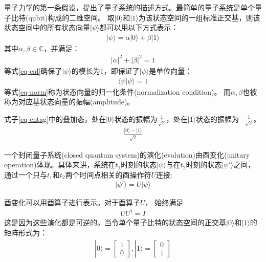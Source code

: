 量子力学的第一条假设，提出了量子系统的描述方式。最简单的量子系统是单个量子比特(qubit)构成的二维空间。
取$|0\rangle$和$|1\rangle$为该状态空间的一组标准正交基，则该状态空间中的所有状态向量$|\psi\rangle$都可以用以下方式表示：
\begin{align}
    |\psi\rangle = \alpha|0\rangle + \beta|1\rangle
\end{align}
其中$\alpha,\beta\in \mathbb{C}$，并满足：
\begin{align}
    |\alpha|^2+|\beta|^2  = 1
    \label{eq-cal}
\end{align}
等式\ref{eq-cal}确保了$|\psi\rangle$的模长为1，即保证了$|\psi\rangle$是单位向量：
\begin{align}
    \langle\psi|\psi\rangle = 1
    \label{eq-norm}
\end{align}
等式\ref{eq-norm}称为状态向量的归一化条件(normalization condition)。
而\(\alpha,\beta\)也被称为对应基状态向量的振幅(amplitude)。
\begin{example}
    式子\ref{eq-entag}中的叠加态，处在$|0\rangle$状态的振幅为$\frac{1}{\sqrt{2}}$，处在$|1\rangle$状态的振幅为$-\frac{1}{\sqrt{2}}$。
\begin{align}
    \label{eq-entag}
    \frac{|0\rangle-|1\rangle}{\sqrt{2}}
\end{align}
\end{example}
\begin{theorem}\citep{nielsen2010quantum}
    一个封闭量子系统(closed quantum system)的演化(evolution)由酉变化(unitary operation)体现。具体来讲，系统在$t_1$时刻的状态$|\psi\rangle$与在$t_2$时刻的状态$|\psi'\rangle$之间，通过一个只与$t_1$和$t_2$两个时间点相关的酉操作符$U$连接:
    \begin{align}
        |\psi'\rangle = U|\psi\rangle
    \end{align}
\end{theorem}
酉变化可以用酉算子进行表示。对于酉算子$U$， 始终满足
\begin{align}
    U U^\dagger = I
\end{align}
这是因为这些演化都是可逆的。当令单个量子比特的状态空间的正交基$|0\rangle$和$|1\rangle$的矩阵形式为：
\begin{align}
    |0\rangle = \left[\begin{matrix}
        1\\0
    \end{matrix}\right],|1\rangle = \left[\begin{matrix}
        0\\1
    \end{matrix}\right]
\end{align}
